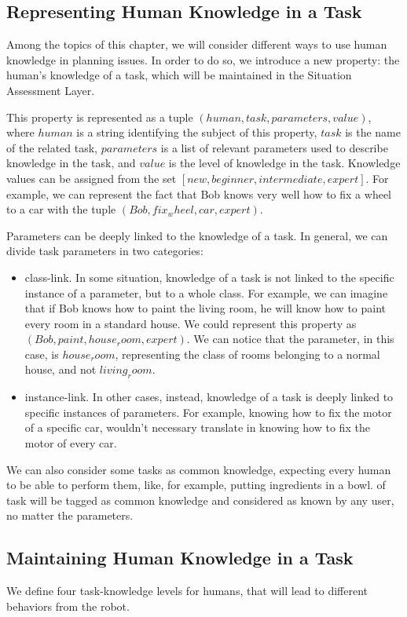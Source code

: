 \subsection{Representing Human Knowledge in a Task}
Among the topics of this chapter, we will consider different ways to use human knowledge in planning issues. In order to do so, we introduce a new property: the human's knowledge of a task, which will be maintained in the Situation Assessment Layer. 

This property is represented as a tuple $(human, task, parameters, value)$, where $human$ is a string identifying the subject of this property, $task$ is the name of the related task, $parameters$ is a list of relevant parameters used to describe knowledge in the task, and $value$ is the level of knowledge in the task. Knowledge values can be assigned from the set $[new, beginner, intermediate, expert]$.  For example, we can represent the fact that Bob knows very well how to fix a wheel to a car with the tuple $(Bob, fix_wheel, car, expert)$. 

Parameters can be deeply linked to the knowledge of a task. In general, we can divide task parameters in two categories:
\begin{itemize}
\item class-link. In some situation, knowledge of a task is not linked to the specific instance of a parameter, but to a whole class. For example, we can imagine that if Bob knows how to paint the living room, he will know how to paint every room in a standard house. We could represent this property as $(Bob, paint, house_room, expert)$. We can notice that the parameter, in this case, is $house_room$, representing the class of rooms belonging to a normal house, and not $living_room$.
\item instance-link. In other cases, instead, knowledge of a task is deeply linked to specific instances of parameters. For example, knowing how to fix the motor of a specific car, wouldn't necessary translate in knowing how to fix the motor of every car.
\end{itemize}

We can also consider some tasks as common knowledge, expecting every human to be able to perform them, like, for example, putting ingredients in a bowl. of task will be tagged as common knowledge and considered as known by any user, no matter the parameters. 

\subsection{Maintaining Human Knowledge in a Task}
We define four task-knowledge levels for humans, that will lead to different behaviors from the robot.

